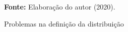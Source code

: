 \begin{figure}[ht!]
\centering

\caption{\textmd{Problemas na definição da distribuição}}
\label{fig:figerroniveis}

\par\medskip\textbf{Fonte:} Elaboração do autor (2020). \par\medskip

\end{figure}

